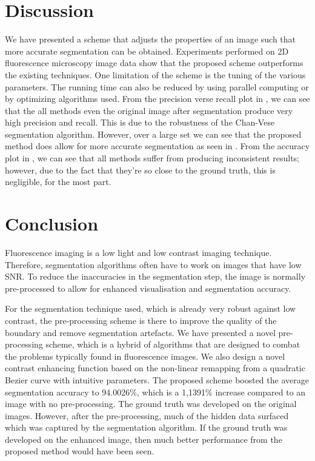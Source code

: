 \section{Discussion}
\label{sec:preprocessschemediscussion}

We have presented a scheme that adjusts the properties of an image such that more accurate segmentation can be obtained. Experiments performed on 2D fluorescence microscopy image data show that the proposed scheme outperforms the existing techniques. One limitation of the scheme is the tuning of the various parameters. The running time can also be reduced by using parallel computing or by optimizing algorithms used. From the precision verse recall plot in , we can see that the all methods even the original image after segmentation produce very high precision and recall. This is due to the robustness of the Chan-Vese segmentation algorithm. However, over a large set we can see that the proposed method does allow for more accurate segmentation as seen in . From the accuracy plot in , we can see that all methods suffer from producing inconsistent results; however, due to the fact that they're so close to the ground truth, this is negligible, for the most part.


\section{Conclusion}
\label{sec:preprocessschemeconclusion}

Fluorescence imaging is a low light and low contrast imaging technique. Therefore, segmentation algorithms often have to work on images that have low SNR. To reduce the inaccuracies in the segmentation step, the image is normally pre-processed to allow for enhanced visualisation and segmentation accuracy.

For the segmentation technique used, which is already very robust against low contrast, the pre-processing scheme is there to improve the quality of the boundary and remove segmentation artefacts. We have presented a novel pre-processing scheme, which is a hybrid of algorithms that are designed to combat the problems typically found in fluorescence images. We also design a novel contrast enhancing function based on the non-linear remapping from a quadratic Bezier curve with intuitive parameters.
The proposed scheme boosted the average segmentation accuracy to 94.0026\%, which is a 1,1391\% increase compared to an image with no pre-processing. The ground truth was developed on the original images. However, after the pre-processing, much of the hidden data surfaced which was captured by the segmentation algorithm. If the ground truth was developed on the enhanced image, then much better performance from the proposed method would have been seen.
